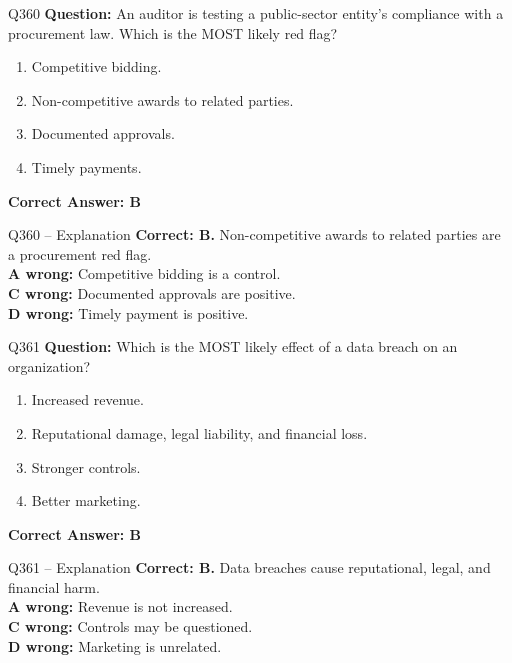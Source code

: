 \documentclass[aspectratio=169,10pt]{beamer}
\begin{document}
	\begin{frame}[t]{Q360}
		\small
		\textbf{Question:} An auditor is testing a public-sector entity's compliance with a procurement law. Which is the MOST likely red flag?
		\begin{enumerate}[label=\Alph*.,itemsep=1pt,topsep=2pt]
			\item Competitive bidding.
			\item Non-competitive awards to related parties.
			\item Documented approvals.
			\item Timely payments.
		\end{enumerate}
		\vspace{4pt}
		\textbf{Correct Answer: B}
	\end{frame}
	
	\begin{frame}[t]{Q360 -- Explanation}
		\small
		\textbf{Correct: B.} Non-competitive awards to related parties are a procurement red flag. \\[4pt]
		\textbf{A wrong:} Competitive bidding is a control. \\[2pt]
		\textbf{C wrong:} Documented approvals are positive. \\[2pt]
		\textbf{D wrong:} Timely payment is positive.
	\end{frame}
	
	\begin{frame}[t]{Q361}
		\small
		\textbf{Question:} Which is the MOST likely effect of a data breach on an organization?
		\begin{enumerate}[label=\Alph*.,itemsep=1pt,topsep=2pt]
			\item Increased revenue.
			\item Reputational damage, legal liability, and financial loss.
			\item Stronger controls.
			\item Better marketing.
		\end{enumerate}
		\vspace{4pt}
		\textbf{Correct Answer: B}
	\end{frame}
	
	\begin{frame}[t]{Q361 -- Explanation}
		\small
		\textbf{Correct: B.} Data breaches cause reputational, legal, and financial harm. \\[4pt]
		\textbf{A wrong:} Revenue is not increased. \\[2pt]
		\textbf{C wrong:} Controls may be questioned. \\[2pt]
		\textbf{D wrong:} Marketing is unrelated.
	\end{frame}
	
\end{document}
